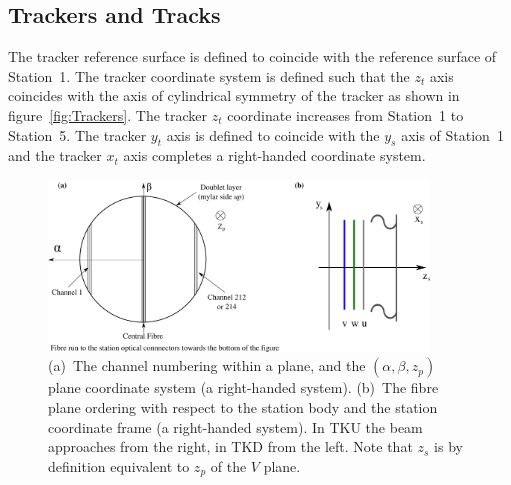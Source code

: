   \subsection{Trackers and Tracks}
  The tracker reference surface is defined to coincide with the reference surface of Station~1. The tracker coordinate system is defined such that the $z_t$ axis coincides with the axis of cylindrical symmetry of the tracker as shown in figure~\ref{fig:Trackers}. The tracker $z_t$ coordinate increases from Station~1 to Station~5. The tracker $y_t$ axis is defined to coincide with the $y_s$ axis of Station~1 and the tracker $x_t$ axis completes a right-handed coordinate system. 
  
  \begin{figure}[htb]
    \begin{center}
      \includegraphics[width=0.9\textwidth]{02-CoordinateSystems/PlaneCoordinatesAndNumbering.pdf}
      \caption{\label{fig:DoubletLayerOrder} (a)~The channel numbering within a plane, and the $(\alpha, \beta, z_p)$ plane coordinate system (a right-handed system).  (b)~The fibre plane ordering with respect to the station body and the station coordinate frame (a right-handed system).  In TKU the beam approaches from the right, in TKD from the left. Note that $z_s$ is by definition equivalent to $z_p$ of the $V$ plane.}
    \end{center}
  \end{figure}


